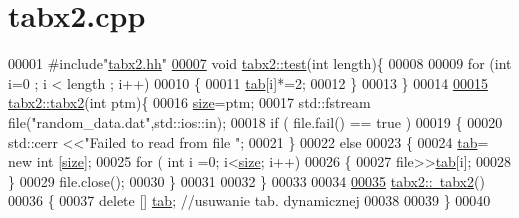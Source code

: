 \hypertarget{tabx2_8cpp_source}{}\section{tabx2.\+cpp}
\label{tabx2_8cpp_source}

\begin{DoxyCode}
00001 \textcolor{preprocessor}{#include"\hyperlink{tabx2_8hh}{tabx2.hh}"}
\hypertarget{tabx2_8cpp_source_l00007}{}\hyperlink{classtabx2_a41eea5dffaea0a866db5c574129c0ee4}{00007} \textcolor{keywordtype}{void} \hyperlink{classtabx2_a41eea5dffaea0a866db5c574129c0ee4}{tabx2::test}(\textcolor{keywordtype}{int} length)\{
00008 
00009   \textcolor{keywordflow}{for} (\textcolor{keywordtype}{int} i=0 ; i < length ; i++)
00010     \{
00011       \hyperlink{classtabx2_ae3ee40d58c1d3dc6a80c34ca63d337e9}{tab}[i]*=2;
00012     \}
00013 \}
00014 
\hypertarget{tabx2_8cpp_source_l00015}{}\hyperlink{classtabx2_a68be0fc6ed6ce41d56011a6f5bad1b00}{00015} \hyperlink{classtabx2_a68be0fc6ed6ce41d56011a6f5bad1b00}{tabx2::tabx2}(\textcolor{keywordtype}{int} ptm)\{
00016   \hyperlink{classtabx2_a9a6db4f12091baed13f8bad9b9538766}{size}=ptm;
00017  std::fstream file(\textcolor{stringliteral}{"random\_data.dat"},std::ios::in);
00018   \textcolor{keywordflow}{if} ( file.fail() == true )
00019     \{
00020       std::cerr <<\textcolor{stringliteral}{"Failed to read from file "};
00021     \}
00022   \textcolor{keywordflow}{else}
00023     \{
00024       \hyperlink{classtabx2_ae3ee40d58c1d3dc6a80c34ca63d337e9}{tab}= \textcolor{keyword}{new} \textcolor{keywordtype}{int} [\hyperlink{classtabx2_a9a6db4f12091baed13f8bad9b9538766}{size}];
00025       \textcolor{keywordflow}{for} ( \textcolor{keywordtype}{int} i =0; i<\hyperlink{classtabx2_a9a6db4f12091baed13f8bad9b9538766}{size}; i++)
00026     \{
00027       file>>\hyperlink{classtabx2_ae3ee40d58c1d3dc6a80c34ca63d337e9}{tab}[i];    
00028     \}
00029       file.close();
00030     \}
00031 
00032 \}
00033 
00034 
\hypertarget{tabx2_8cpp_source_l00035}{}\hyperlink{classtabx2_a6e259fbc3e5791ae3a11df988a8369c0}{00035} \hyperlink{classtabx2_a6e259fbc3e5791ae3a11df988a8369c0}{tabx2::~tabx2}()
00036 \{
00037   \textcolor{keyword}{delete} [] \hyperlink{classtabx2_ae3ee40d58c1d3dc6a80c34ca63d337e9}{tab}; \textcolor{comment}{//usuwanie tab. dynamicznej}
00038   
00039 \}
00040 
\end{DoxyCode}
